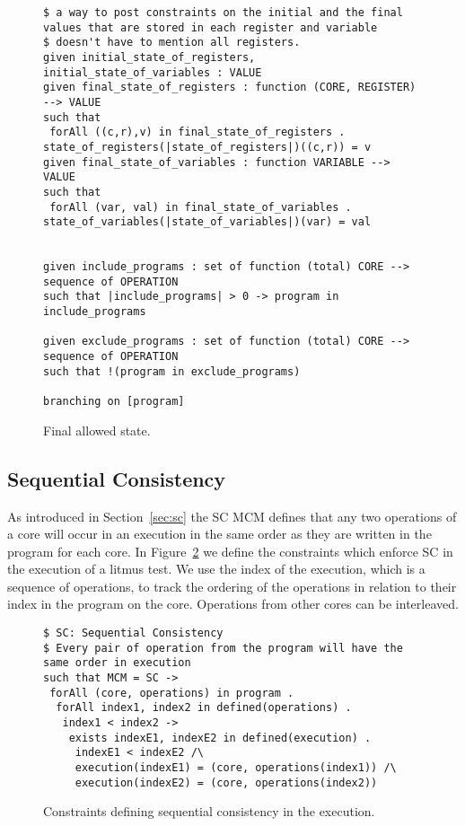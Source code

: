 \documentclass[runningheads]{llncs}
\begin{document}
\begin{figure}
\begin{lstlisting}
$ a way to post constraints on the initial and the final values that are stored in each register and variable
$ doesn't have to mention all registers.
given initial_state_of_registers, initial_state_of_variables : VALUE
given final_state_of_registers : function (CORE, REGISTER) --> VALUE
such that
 forAll ((c,r),v) in final_state_of_registers . state_of_registers(|state_of_registers|)((c,r)) = v
given final_state_of_variables : function VARIABLE --> VALUE
such that
 forAll (var, val) in final_state_of_variables . state_of_variables(|state_of_variables|)(var) = val


given include_programs : set of function (total) CORE --> sequence of OPERATION
such that |include_programs| > 0 -> program in include_programs

given exclude_programs : set of function (total) CORE --> sequence of OPERATION
such that !(program in exclude_programs)

branching on [program]
\end{lstlisting}
\caption{Final allowed state.\label{fig:essence6}}
\end{figure}




\subsection{Sequential Consistency}
As introduced in Section~\ref{sec:sc} the SC MCM defines that any two operations of a core will occur in an execution in the same order as they are written in the program for each core.
In Figure~\ref{fig:essenceSC} we define the constraints which enforce SC in the execution of a litmus test.
We use the index of the execution, which is a sequence of operations, to track the ordering of the operations in relation to their index in the program on the core.
Operations from other cores can be interleaved.

\begin{figure}
\begin{lstlisting}
$ SC: Sequential Consistency
$ Every pair of operation from the program will have the same order in execution
such that MCM = SC ->
 forAll (core, operations) in program .
  forAll index1, index2 in defined(operations) .
   index1 < index2 ->
    exists indexE1, indexE2 in defined(execution) .
     indexE1 < indexE2 /\
     execution(indexE1) = (core, operations(index1)) /\
     execution(indexE2) = (core, operations(index2))
\end{lstlisting}
\caption{Constraints defining sequential consistency in the execution. \label{fig:essenceSC}}
\end{figure}
\end{document}
